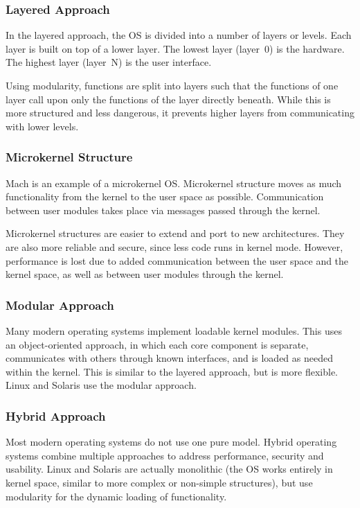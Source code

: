 \subsubsection{Layered Approach}

In the layered approach, the OS is divided into a number of layers or levels.
Each layer is built on top of a lower layer.
The lowest layer (layer~0) is the hardware.
The highest layer (layer~N) is the user interface.

Using modularity, functions are split into layers such that the functions of one layer call upon only the functions of the layer directly beneath.
While this is more structured and less dangerous, it prevents higher layers from communicating with lower levels.

\subsubsection{Microkernel Structure}

Mach is an example of a microkernel OS\@.
Microkernel structure moves as much functionality from the kernel to the user space as possible.
Communication between user modules takes place via messages passed through the kernel.

Microkernel structures are easier to extend and port to new architectures.
They are also more reliable and secure, since less code runs in kernel mode.
However, performance is lost due to added communication between the user space and the kernel space, as well as between user modules through the kernel.

\subsubsection{Modular Approach}

Many modern operating systems implement loadable kernel modules.
This uses an object-oriented approach, in which each core component is separate, communicates with others through known interfaces, and is loaded as needed within the kernel.
This is similar to the layered approach, but is more flexible.
Linux and Solaris use the modular approach.

\subsubsection{Hybrid Approach}

Most modern operating systems do not use one pure model.
Hybrid operating systems combine multiple approaches to address performance, security and usability.
Linux and Solaris are actually monolithic (the OS works entirely in kernel space, similar to more complex or non-simple structures), but use modularity for the dynamic loading of functionality.

